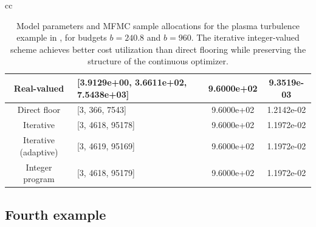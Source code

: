 \begin{table}[ht]
{\begin{tabular}{cc}
\begin{minipage}{0.73\linewidth}
\begin{tabular}{|c|p{4.9cm}|c|c|}
Real-valued 
& [3.9129e+00, 3.6611e+02, 7.5438e+03]
& 9.6000e+02 & 9.3519e-03 \\ \hline

Direct floor 
& [3, 366, 7543]
& 9.6000e+02 & 1.2142e-02 \\ \hline

Iterative 
& [3, 4618, 95178]
& 9.6000e+02 & 1.1972e-02 \\ \hline

Iterative (adaptive)
& [3, 4619, 95169]
& 9.6000e+02 & 1.1972e-02 \\ \hline

Integer program
& [3,  4618, 95179]
& 9.6000e+02 & 1.1972e-02 \\ \hline

\end{tabular}
\end{minipage}

\end{tabular}
}
\caption{Model parameters and MFMC sample allocations for the plasma turbulence example in \cite{KoFaPeDiJeNeBu:2022}, for budgets $b=240.8$ and $b=960$. The iterative integer-valued scheme achieves better cost utilization than direct flooring while preserving the structure of the continuous optimizer.}
\label{tab:MFMC_integer_comparison_Eg3}
\end{table}



\subsection{Fourth example}



